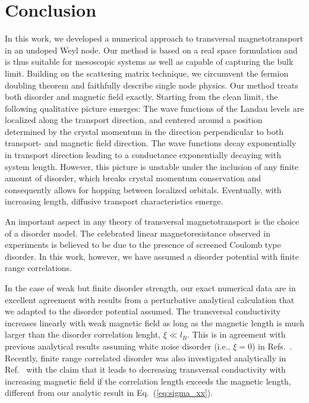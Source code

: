 \documentclass[aps,prb,10pt,amsmath,amssymb,twocolumn,floatfix,superscriptaddress,showpacs,numerical,footinbib]{revtex4-1}
\begin{document}
\section{Conclusion \label{sec:conclusion}}
In this work, we developed a numerical approach to transversal magnetotransport in an undoped Weyl node. Our method is based on a real space formulation and is thus suitable for mesoscopic systems as well as capable of capturing the bulk limit. Building on the scattering matrix technique, we circumvent the fermion doubling theorem and faithfully describe single node physics. Our method treats both disorder and magnetic field exactly. Starting from the clean limit, the following qualitative picture emerges: The wave functions of the Landau levels are localized along the transport direction, and centered around a position determined by the crystal momentum in the direction perpendicular to both transport- and magnetic field direction. The wave functions decay exponentially in transport direction leading to a conductance exponentially decaying with system length. However, this picture is unstable under the inclusion of any finite amount of disorder, which breaks crystal momentum conservation and consequently allows for hopping between localized orbitals. Eventually, with increasing length, diffusive transport characteristics emerge.

An important aspect in any theory of transversal magnetotransport is the choice of a disorder model. The celebrated linear magnetoresistance observed in experiments is believed to be due to the presence of screened Coulomb type disorder. In this work, however, we have assumed a disorder potential with finite range correlations.

In the case of weak but finite disorder strength, our exact numerical data are in excellent agreement with results from a perturbative analytical calculation that we adapted to the disorder potential assumed.
%
The transversal conductivity increases linearly with weak magnetic field as long as the magnetic length is much larger than the disorder correlation lenght, $\xi \ll l_B$.
%
This is in agreement with previous analytical results assuming white noise disorder (i.e., $\xi=0$) in Refs.~.
%
Recently, finite range correlated disorder was also investigated analytically in Ref.~ with the claim that it leads to decreasing transversal conductivity with increasing magnetic field if the correlation length exceeds the magnetic length, different from our analytic result in Eq.~(\ref{eq:sigma_xx}).
\end{document}
